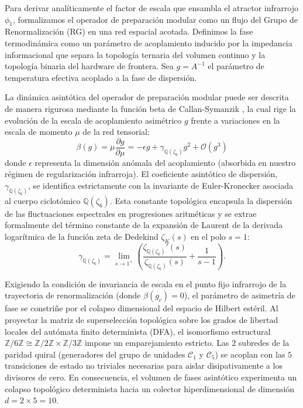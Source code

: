 \documentclass[12pt,a4paper]{article}
\theoremstyle{plain}
\theoremstyle{definition}
\theoremstyle{remark}
\begin{document}
Para derivar analíticamente el factor de escala que ensambla el atractor infrarrojo $\phi_1$, formalizamos el operador de preparación modular como un flujo del Grupo de Renormalización (RG) en una red espacial acotada. Definimos la fase termodinámica como un parámetro de acoplamiento inducido por la impedancia informacional que separa la topología ternaria del volumen continuo y la topología binaria del hardware de frontera. Sea $g = A^{-1}$ el parámetro de temperatura efectiva acoplado a la fase de dispersión. 

La dinámica asintótica del operador de preparación modular puede ser descrita de manera rigurosa mediante la función beta de Callan-Symanzik \cite{Callan1970}, la cual rige la evolución de la escala de acoplamiento asimétrico $g$ frente a variaciones en la escala de momento $\mu$ de la red tensorial:
\begin{equation}
\beta(g) = \mu \frac{\partial g}{\partial \mu} = -\epsilon g + \gamma_{\mathbb{Q}(\zeta_6)} g^2 + \mathcal{O}(g^3)
\label{eq:beta_function}
\end{equation}
donde $\epsilon$ representa la dimensión anómala del acoplamiento (absorbida en nuestro régimen de regularización infrarroja). El coeficiente asintótico de dispersión, $\gamma_{\mathbb{Q}(\zeta_6)}$, se identifica estrictamente con la invariante de Euler-Kronecker asociada al cuerpo ciclotómico $\mathbb{Q}(\zeta_6)$. Esta constante topológica encapsula la dispersión de las fluctuaciones espectrales en progresiones aritméticas y se extrae formalmente del término constante de la expansión de Laurent de la derivada logarítmica de la función zeta de Dedekind $\zeta_K(s)$ en el polo $s=1$:
\begin{equation}
\gamma_{\mathbb{Q}(\zeta_6)} = \lim_{s\to 1^+} \left( \frac{\zeta_{\mathbb{Q}(\zeta_6)}'(s)}{\zeta_{\mathbb{Q}(\zeta_6)}(s)} + \frac{1}{s-1} \right).
\end{equation}

Exigiendo la condición de invariancia de escala en el punto fijo infrarrojo de la trayectoria de renormalización (donde $\beta(g_c) = 0$), el parámetro de asimetría de fase se constriñe por el colapso dimensional del espacio de Hilbert estéril. Al proyectar la matriz de superselección topológica sobre los grados de libertad locales del autómata finito determinista (DFA), el isomorfismo estructural $\mathbb{Z}/6\mathbb{Z} \cong \mathbb{Z}/2\mathbb{Z} \times \mathbb{Z}/3\mathbb{Z}$ impone un emparejamiento estricto. Las $2$ subredes de la paridad quiral (generadores del grupo de unidades $\mathcal{C}_1$ y $\mathcal{C}_5$) se acoplan con las $5$ transiciones de estado no triviales necesarias para aislar disipativamente a los divisores de cero. En consecuencia, el volumen de fases asintótico experimenta un colapso topológico determinista hacia un colector hiperdimensional de dimensión $d = 2 \times 5 = 10$.
\end{document}
